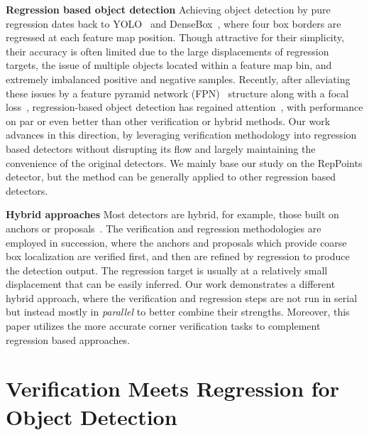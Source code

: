 \documentclass{article}
\begin{document}
\textbf{Regression based object detection}
Achieving object detection by pure regression dates back to YOLO~\cite{YOLO} and DenseBox~\cite{DenseBox}, where four box borders are regressed at each feature map position. Though attractive for their simplicity, their accuracy is often limited due to the large displacements of regression targets, the issue of multiple objects located within a feature map bin, and extremely imbalanced positive and negative samples. Recently, after alleviating these issues by a feature pyramid network (FPN)~\cite{FPN} structure along with a focal loss~\cite{RetinaNet}, regression-based object detection has regained attention~\cite{tian2019fcos,kong2019foveabox,zhou2019objects,yang19reppts}, with performance on par or even better than other verification or hybrid methods. Our work advances in this direction, by leveraging verification methodology into regression based detectors without disrupting its flow and largely maintaining the convenience of the original detectors. We mainly base our study on the RepPoints detector, but the method can be generally applied to other regression based detectors. 

\textbf{Hybrid approaches} 
Most detectors are hybrid, for example, those built on anchors or proposals~\cite{girshick2014rich,girshick2015fast,ren15faster,RetinaNet,Cascade-rcnn,lu19gridrcnn}. The verification and regression methodologies are employed in succession, where the anchors and proposals which provide coarse box localization are verified first, and then are refined by regression to produce the detection output. The regression target is usually at a relatively small displacement that can be easily inferred. Our work demonstrates a different hybrid approach, where the verification and regression steps are not run in serial but instead mostly in \emph{parallel} to better combine their strengths. Moreover, this paper utilizes the more accurate corner verification tasks to complement regression based approaches.


\section{Verification Meets Regression for Object Detection}
\end{document}
